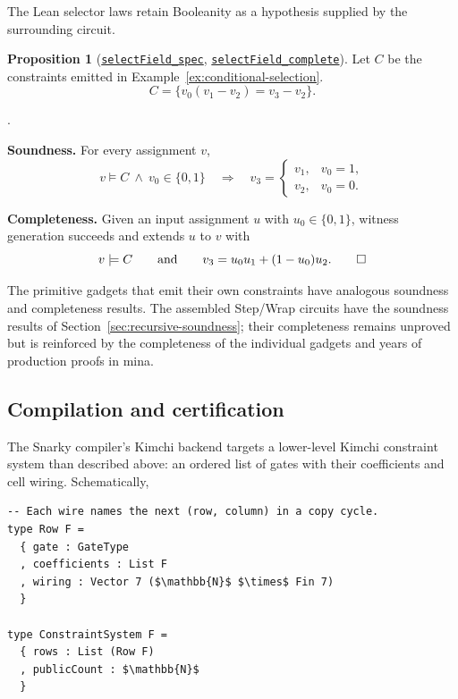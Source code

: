 \documentclass[11pt,a4paper]{article}
\newcommand{\inlinecode}[1]{\mbox{\texttt{#1}}}
\newenvironment{schematicblock}
  {\par\noindent\begin{minipage}{\linewidth}}
  {\end{minipage}\par}
\theoremstyle{definition}
\theoremstyle{insetstatement}
\newtheorem{propositiontext}[example]{Proposition}
\newenvironment{statementblock}
  {\begin{list}{}{%
    \setlength{\leftmargin}{0pt}%
    \setlength{\rightmargin}{0pt}%
    \setlength{\labelwidth}{0pt}%
    \setlength{\labelsep}{0pt}%
    \setlength{\itemindent}{0pt}%
    \setlength{\listparindent}{0pt}%
    \setlength{\topsep}{.7\baselineskip plus 2pt minus 1pt}%
    \setlength{\partopsep}{0pt}%
    \setlength{\parsep}{0pt}%
    \setlength{\itemsep}{0pt}}%
    \item\relax}
  {\end{list}}
\newenvironment{proposition}[1][]
  {\begin{statementblock}\begin{propositiontext}[{#1}]\pushQED{\qed}}
  {\popQED\end{propositiontext}\end{statementblock}}
\newcounter{boundarypart}
\newenvironment{boundary}{\begin{list}{\arabic{boundarypart}.}{
  \usecounter{boundarypart}
  \setlength{\leftmargin}{1.6em}
  \setlength{\labelwidth}{1.1em}
  \setlength{\labelsep}{0.5em}
  \setlength{\itemsep}{2pt}
  \setlength{\topsep}{3pt}
  \setlength{\parsep}{0pt}}}{\end{list}}
\begin{document}
The Lean selector laws retain Booleanity as a hypothesis supplied by the
surrounding circuit.

\begin{proposition}[\href{https://github.com/l-adic/snarky/blob/main/formal/snarky/Snarky/DSL/Boolean.lean\#L93}{\inlinecode{selectField\_spec}}, \href{https://github.com/l-adic/snarky/blob/main/formal/snarky/Snarky/DSL/Boolean.lean\#L164}{\inlinecode{selectField\_complete}}]
\label{prop:selector-correctness}
Let $C$ be the constraints emitted in Example~\ref{ex:conditional-selection}.
\[
  C = \{v_0(v_1 - v_2) = v_3 - v_2\}.
\]
\begin{boundary}
  \item \textbf{Soundness.} For every assignment $v$,
    \[
      v\models C\ \land\ v_0\in\{0,1\}\quad\Longrightarrow\quad
      v_3=\begin{cases}
        v_1,&v_0=1,\\
        v_2,&v_0=0.
      \end{cases}
    \]
  \item \textbf{Completeness.} Given an input assignment $u$ with
    $u_0\in\{0,1\}$, witness generation succeeds and extends $u$ to $v$ with
    \[
      v\models C\qquad\text{and}\qquad
      v_3=u_0u_1+(1-u_0)u_2.\qedhere
    \]
\end{boundary}
\end{proposition}

The primitive gadgets that emit their own constraints have analogous
soundness and completeness results. The assembled Step/Wrap circuits have the soundness results of
Section~\ref{sec:recursive-soundness}; their completeness remains unproved
but is reinforced by the completeness of the individual gadgets and years of
production proofs in mina.

\subsection{Compilation and certification}
\label{sec:compilation}

The Snarky compiler's Kimchi backend targets a lower-level Kimchi constraint system
than described above: an ordered list of gates with their coefficients and cell wiring.
Schematically,

\begin{schematicblock}
\begin{lstlisting}[style=schematic]
-- Each wire names the next (row, column) in a copy cycle.
type Row F =
  { gate : GateType
  , coefficients : List F
  , wiring : Vector 7 ($\mathbb{N}$ $\times$ Fin 7)
  }

type ConstraintSystem F =
  { rows : List (Row F)
  , publicCount : $\mathbb{N}$
  }
\end{lstlisting}
\end{schematicblock}
\end{document}
